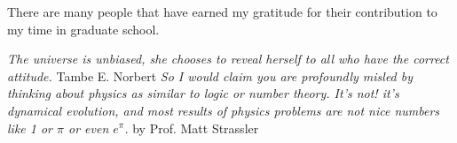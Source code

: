 
There are many people that have earned my gratitude for their contribution to my
time in graduate school. 

\textit{The universe is unbiased, she chooses to reveal herself to all who have the correct attitude.}
\newline
\textsf{Tambe E. Norbert}
\newline
\textit{So I would claim you are profoundly misled by thinking about physics as similar to logic or number theory. It’s not! it’s dynamical evolution, and most results of physics problems are not nice numbers like 1 or $\pi$ or even $e^{\pi}$.}
\newline
\textsf{by Prof. Matt Strassler}


